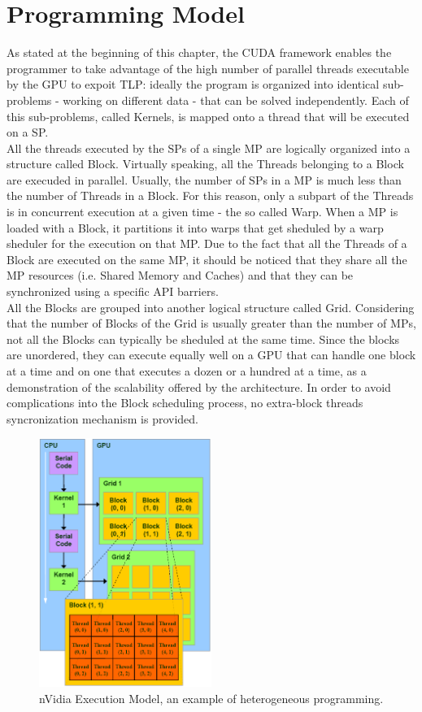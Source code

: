 \section{Programming Model}
As stated at the beginning of this chapter, the CUDA framework enables the programmer to take advantage of the high number of parallel threads executable by the GPU to expoit TLP: ideally the program is organized into identical sub-problems - working on different data - that can be solved independently. Each of this sub-problems, called Kernels, is mapped onto a thread that will be executed on a SP.\\
All the threads executed by the SPs of a single MP are logically organized into a structure called Block. Virtually speaking, all the Threads belonging to a Block are execuded in parallel. Usually, the number of SPs in a MP is much less than the number of Threads in a Block. For this reason, only a subpart of the Threads is in concurrent execution at a given time - the so called Warp. When a MP is loaded with a Block, it partitions it into warps that get sheduled by a warp sheduler for the execution on that MP. Due to the fact that all the Threads of a Block are executed on the same MP, it should be noticed that they share all the MP resources (i.e. Shared Memory and Caches) and that they can be synchronized using a specific API barriers.\\
All the Blocks are grouped into another logical structure called Grid. Considering that the number of Blocks of the Grid is usually greater than the number of MPs, not all the Blocks can typically be sheduled at the same time. Since the blocks are unordered, they can execute equally well on a GPU that can handle one block at a time and on one that executes a dozen or a hundred at a time, as a demonstration of the scalability offered by the architecture. In order to avoid complications into the Block scheduling process, no extra-block threads syncronization mechanism is provided.\\ 

\begin{figure}[h!bt]
	\centerline{\includegraphics[width=0.5\textwidth]{img/nVidiaExecutionModel.png}}
	\caption{nVidia Execution Model, an example of heterogeneous programming.}
	\label{fig:nVidiaGPUsLogicalOrg}
\end{figure}

